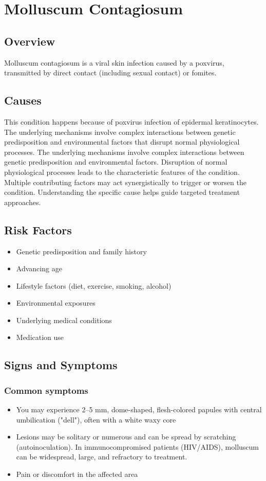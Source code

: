 \chapter{Molluscum Contagiosum}
\label{sec:Molluscum Contagiosum}

\section{Overview}
Molluscum contagiosum is a viral skin infection caused by a poxvirus, transmitted by direct contact (including sexual contact) or fomites.
\section{Causes}
This condition happens because of poxvirus infection of epidermal keratinocytes. The underlying mechanisms involve complex interactions between genetic predisposition and environmental factors that disrupt normal physiological processes. The underlying mechanisms involve complex interactions between genetic predisposition and environmental factors. Disruption of normal physiological processes leads to the characteristic features of the condition. Multiple contributing factors may act synergistically to trigger or worsen the condition. Understanding the specific cause helps guide targeted treatment approaches.
\section{Risk Factors}


\begin{itemize}[noitemsep]
  \item Genetic predisposition and family history
  \item Advancing age
  \item Lifestyle factors (diet, exercise, smoking, alcohol)
  \item Environmental exposures
  \item Underlying medical conditions
  \item Medication use
\end{itemize}
\section{Signs and Symptoms}

\subsection{Common symptoms}
\begin{itemize}[noitemsep]
  \item You may experience 2--5 mm, dome-shaped, flesh-colored papules with central umbilication ("dell"), often with a white waxy core
  \item Lesions may be solitary or numerous and can be spread by scratching (autoinoculation). In immunocompromised patients (HIV/AIDS), molluscum can be widespread, large, and refractory to treatment.
  \item Pain or discomfort in the affected area
  \end{itemize}

